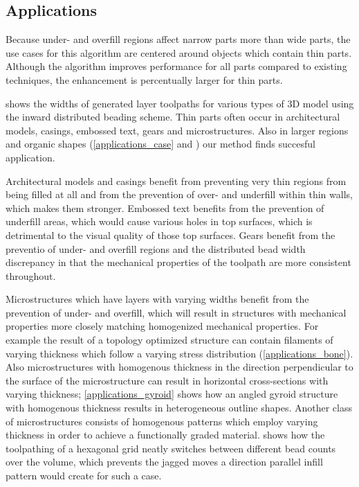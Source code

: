 \subsection{Applications}
Because under- and overfill regions affect narrow parts more than wide parts, the use cases for this algorithm are centered around objects which contain thin parts.
Although the algorithm improves performance for all parts compared to existing techniques, the enhancement is percentually larger for thin parts.


 shows the widths of generated layer toolpaths for various types of 3D model using the inward distributed beading scheme.
Thin parts often occur in architectural models, casings, embossed text, gears and microstructures.
Also in larger regions and organic shapes (\cref{applications_case} and ) our method finds succesful application.

Architectural models and casings benefit from preventing very thin regions from being filled at all and from the prevention of over- and underfill within thin walls, which makes them stronger.
Embossed text benefits from the prevention of underfill areas, which would cause various holes in top surfaces, which is detrimental to the visual quality of those top surfaces.
Gears benefit from the preventio of under- and overfill regions and the distributed bead width discrepancy in that the mechanical properties of the toolpath are more consistent throughout.

Microstructures which have layers with varying widths benefit from the prevention of under- and overfill, which will result in structures with mechanical properties more closely matching homogenized mechanical properties.
For example the result of a topology optimized structure can contain filaments of varying thickness \cite{wu2017infill} which follow a varying stress distribution (\cref{applications_bone}).
Also microstructures with homogenous thickness in the direction perpendicular to the surface of the microstructure can result in horizontal cross-sections with varying thickness;
\cref{applications_gyroid} shows how an angled gyroid structure with homogenous thickness results in heterogeneous outline shapes.
Another class of microstructures consists of homogenous patterns which employ varying thickness in order to achieve a functionally graded material.
 shows how the toolpathing of a hexagonal grid neatly switches between different bead counts over the volume, which prevents the jagged moves a direction parallel infill pattern would create for such a case. \cite{bates2018compressive}



